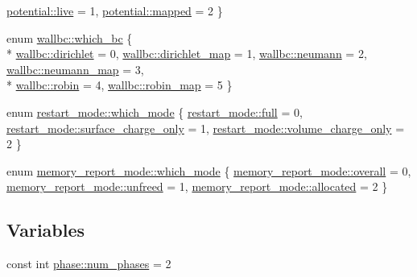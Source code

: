 \begin{DoxyCompactItemize}
\hyperlink{namespacepotential_a22249d745e66b412864d893590d05b21a4d82e18dd4ef4287d64d25b71770fed2}{potential\+::live} = 1, 
\hyperlink{namespacepotential_a22249d745e66b412864d893590d05b21a258f5d3f3c54b96ebb4fc1eff63fda41}{potential\+::mapped} = 2
 \}
\item 
enum \hyperlink{namespacewallbc_ac79598e478fbcdc07082173cc75d4d99}{wallbc\+::which\+\_\+bc} \{ \\*
\hyperlink{namespacewallbc_ac79598e478fbcdc07082173cc75d4d99aa5f52de5b35082184d1cfee9917603dc}{wallbc\+::dirichlet} = 0, 
\hyperlink{namespacewallbc_ac79598e478fbcdc07082173cc75d4d99ae706408b9a4d47f84d5706774f355651}{wallbc\+::dirichlet\+\_\+map} = 1, 
\hyperlink{namespacewallbc_ac79598e478fbcdc07082173cc75d4d99af96af98ad1a4a3c3dc14811cdee51acc}{wallbc\+::neumann} = 2, 
\hyperlink{namespacewallbc_ac79598e478fbcdc07082173cc75d4d99a3e2effbc735fbd334c608be3c0add026}{wallbc\+::neumann\+\_\+map} = 3, 
\\*
\hyperlink{namespacewallbc_ac79598e478fbcdc07082173cc75d4d99a53a49fbbe63fe8473b1fda4f5d349338}{wallbc\+::robin} = 4, 
\hyperlink{namespacewallbc_ac79598e478fbcdc07082173cc75d4d99acd7d4e427fef897bb2df4242bb2fb472}{wallbc\+::robin\+\_\+map} = 5
 \}
\item 
enum \hyperlink{namespacerestart__mode_aa9c13b092e65386120f08a8862e576ee}{restart\+\_\+mode\+::which\+\_\+mode} \{ \hyperlink{namespacerestart__mode_aa9c13b092e65386120f08a8862e576eeab9574a3e991f026dd44e29d1bf01bb18}{restart\+\_\+mode\+::full} = 0, 
\hyperlink{namespacerestart__mode_aa9c13b092e65386120f08a8862e576eeabbca8cbf7efb1daef62378e1af5a829b}{restart\+\_\+mode\+::surface\+\_\+charge\+\_\+only} = 1, 
\hyperlink{namespacerestart__mode_aa9c13b092e65386120f08a8862e576eea23cf5e0805fa4f6c921fb27706e91913}{restart\+\_\+mode\+::volume\+\_\+charge\+\_\+only} = 2
 \}
\item 
enum \hyperlink{namespacememory__report__mode_a7a376e3e2cdf985fc8a6d33aa68c6f44}{memory\+\_\+report\+\_\+mode\+::which\+\_\+mode} \{ \hyperlink{namespacememory__report__mode_a7a376e3e2cdf985fc8a6d33aa68c6f44ad83a77b03c3bc103e7585e216d48d7cb}{memory\+\_\+report\+\_\+mode\+::overall} = 0, 
\hyperlink{namespacememory__report__mode_a7a376e3e2cdf985fc8a6d33aa68c6f44aa200e26c11a01b0ef2da4b852a1ee4b8}{memory\+\_\+report\+\_\+mode\+::unfreed} = 1, 
\hyperlink{namespacememory__report__mode_a7a376e3e2cdf985fc8a6d33aa68c6f44a934cc59d6c86c4090c1a2e61af7428d4}{memory\+\_\+report\+\_\+mode\+::allocated} = 2
 \}
\end{DoxyCompactItemize}
\subsection*{Variables}
\begin{DoxyCompactItemize}
\item 
const int \hyperlink{namespacephase_ae6aa8f0634c0dc938684be3b754de921}{phase\+::num\+\_\+phases} = 2
\end{DoxyCompactItemize}



